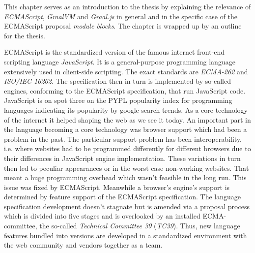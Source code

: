 This chapter serves as an introduction to the thesis by explaining the relevance of \emph{ECMAScript}, \emph{GraalVM} and \emph{Graal.js} in general and in the specific case of the ECMAScript proposal \emph{module blocks}. The chapter is wrapped up by an outline for the thesis.

ECMAScript \cite{ecma} is the standardized version of the famous internet front-end scripting language \emph{JavaScript}. It is a general-purpose programming language extensively used in client-side scripting. The exact standards are \emph{ECMA-262} and \emph{ISO/IEC 16262}\cite{ecma}. The specification then in turn is implemented by so-called engines, conforming to the ECMAScript specification, that run JavaScript code. JavaScript is on spot three on the PYPL popularity index for programming languages \cite{pypl} indicating its popularity by google search trends. As a core technology of the internet it helped shaping the web as we see it today. An important part in the language becoming a core technology was browser support which had been a problem in the past. The particular support problem has been interoperability, i.e. where websites had to be programmed differently for different browsers due to their differences in JavaScript engine implementation\cite{10.1145/3386327}. These variations in turn then led to peculiar appearances or in the worst case non-working websites. That meant a huge programming overhead which wasn't feasible in the long run. This issue was fixed by ECMAScript. Meanwhile a browser's engine's support is determined by feature support of the ECMAScript specification. The language specification development doesn't stagnate but is amended via a proposal process which is divided into five stages and is overlooked by an installed ECMA-committee, the so-called \emph{Technical Committee 39} (\emph{TC39}). Thus, new language features bundled into versions are developed in a standardized environment with the web community and vendors together as a team. 

